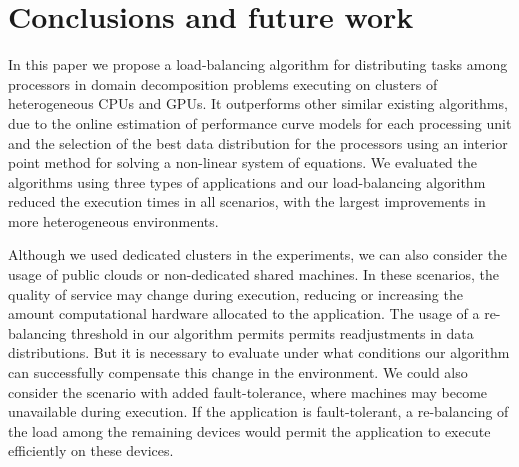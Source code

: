\documentclass[journal]{IEEEtran}
\begin{document}




\section{Conclusions and future work}

In this paper we propose a load-balancing algorithm for distributing tasks among
processors in domain decomposition problems executing on clusters of
heterogeneous CPUs and GPUs. It outperforms other similar existing algorithms,
due to the online estimation of performance curve models for each processing
unit and the selection of the best data distribution for the processors using an
interior point method for solving a non-linear system of equations. We evaluated
the algorithms using three types of applications and our load-balancing
algorithm reduced the execution times in all scenarios, with the largest
improvements in more heterogeneous environments.

Although we used dedicated clusters in the experiments, we can also consider the
usage of public clouds or non-dedicated shared machines. In these scenarios, the
quality of service may change during execution, reducing or increasing the
amount computational hardware allocated to the application. The usage of a
re-balancing threshold in our algorithm permits permits readjustments in data
distributions. But it is necessary to evaluate under what conditions our
algorithm can successfully compensate this change in the environment. We could
also consider the scenario with added fault-tolerance, where machines may become
unavailable during execution. If the application is fault-tolerant, a
re-balancing of the load among the remaining devices would permit the
application to execute efficiently on these devices.
\end{document}
